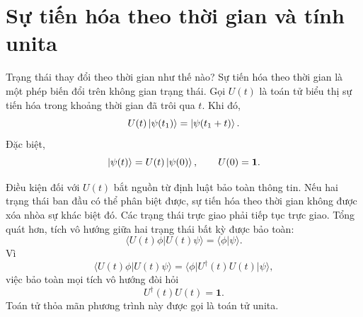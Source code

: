 \section{Sự tiến hóa theo thời gian và tính unita}

Trạng thái thay đổi theo thời gian như thế nào? Sự tiến hóa theo thời gian là một phép biến đổi trên không gian trạng thái. Gọi \(U(t)\) là toán tử biểu thị sự tiến hóa trong khoảng thời gian đã trôi qua \(t\). Khi đó,
\begin{equation}
U(t)\left\lvert\psi(t_1)\right\rangle=\left\lvert\psi(t_1+t)\right\rangle.
\end{equation}
Đặc biệt,
\begin{equation}
\left\lvert\psi(t)\right\rangle=U(t)\left\lvert\psi(0)\right\rangle,
\qquad
U(0)=\mathbf 1.
\end{equation}

Điều kiện đối với \(U(t)\) bắt nguồn từ định luật bảo toàn thông tin. Nếu hai trạng thái ban đầu có thể phân biệt được, sự tiến hóa theo thời gian không được xóa nhòa sự khác biệt đó. Các trạng thái trực giao phải tiếp tục trực giao. Tổng quát hơn, tích vô hướng giữa hai trạng thái bất kỳ được bảo toàn:
\begin{equation}
\langle U(t)\phi|U(t)\psi\rangle
=\langle\phi|\psi\rangle.
\end{equation}
Vì
\begin{equation}
\langle U(t)\phi|U(t)\psi\rangle
=\langle\phi|U^\dagger(t)U(t)|\psi\rangle,
\end{equation}
việc bảo toàn mọi tích vô hướng đòi hỏi
\begin{equation}
U^\dagger(t)U(t)=\mathbf 1.
\end{equation}
Toán tử thỏa mãn phương trình này được gọi là toán tử unita.

\begin{classroomqa}
\end{classroomqa}



